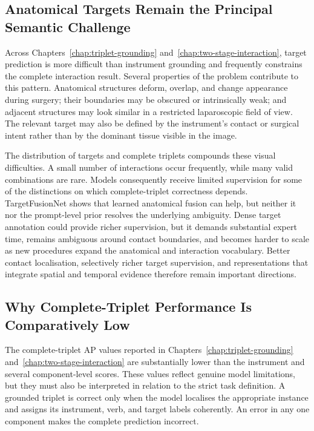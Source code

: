 \subsection{Anatomical Targets Remain the Principal Semantic Challenge}
\label{sec:discussion-target-insight}

Across Chapters~\ref{chap:triplet-grounding} and~\ref{chap:two-stage-interaction}, target prediction is more difficult than instrument grounding and frequently constrains the complete interaction result. Several properties of the problem contribute to this pattern. Anatomical structures deform, overlap, and change appearance during surgery; their boundaries may be obscured or intrinsically weak; and adjacent structures may look similar in a restricted laparoscopic field of view. The relevant target may also be defined by the instrument's contact or surgical intent rather than by the dominant tissue visible in the image.

The distribution of targets and complete triplets compounds these visual difficulties. A small number of interactions occur frequently, while many valid combinations are rare. Models consequently receive limited supervision for some of the distinctions on which complete-triplet correctness depends. TargetFusionNet shows that learned anatomical fusion can help, but neither it nor the prompt-level prior resolves the underlying ambiguity. Dense target annotation could provide richer supervision, but it demands substantial expert time, remains ambiguous around contact boundaries, and becomes harder to scale as new procedures expand the anatomical and interaction vocabulary. Better contact localisation, selectively richer target supervision, and representations that integrate spatial and temporal evidence therefore remain important directions.

\subsection{Why Complete-Triplet Performance Is Comparatively Low}
\label{sec:discussion-low-triplet-performance}

The complete-triplet AP values reported in Chapters~\ref{chap:triplet-grounding} and~\ref{chap:two-stage-interaction} are substantially lower than the instrument and several component-level scores. These values reflect genuine model limitations, but they must also be interpreted in relation to the strict task definition. A grounded triplet is correct only when the model localises the appropriate instance and assigns its instrument, verb, and target labels coherently. An error in any one component makes the complete prediction incorrect.

